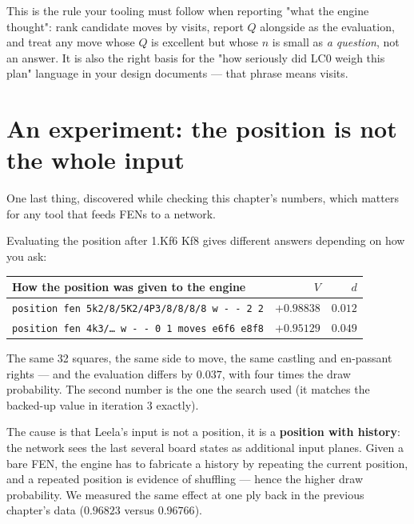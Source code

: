\begin{repobox}[title={in this repository}]
This is the rule your tooling must follow when reporting "what the engine thought": rank
candidate moves by visits, report $Q$ alongside as the evaluation, and treat any move whose
$Q$ is excellent but whose $n$ is small as \emph{a question}, not an answer. It is also the
right basis for the "how seriously did LC0 weigh this plan" language in your design
documents --- that phrase means visits.
\end{repobox}

\section{An experiment: the position is not the whole input}

One last thing, discovered while checking this chapter's numbers, which matters for any tool
that feeds FENs to a network.

Evaluating the position after 1.Kf6 Kf8 gives different answers depending on how you ask:

\begin{realdata}[title={Real experiment: same board, two histories}]
\begin{center}
\begin{tabular}{@{}lrr@{}}
\toprule
How the position was given to the engine & $V$ & $d$ \\
\midrule
\texttt{position fen 5k2/8/5K2/4P3/8/8/8/8 w - - 2 2} & $+0.98838$ & $0.012$ \\
\texttt{position fen 4k3/\ldots\ w - - 0 1 moves e6f6 e8f8} & $+0.95129$ & $0.049$ \\
\bottomrule
\end{tabular}
\end{center}
The same 32 squares, the same side to move, the same castling and en-passant rights ---
and the evaluation differs by $0.037$, with four times the draw probability. The second
number is the one the search used (it matches the backed-up value in iteration 3 exactly).
\end{realdata}

The cause is that Leela's input is not a position, it is a \textbf{position with history}:
the network sees the last several board states as additional input planes. Given a bare FEN,
the engine has to fabricate a history by repeating the current position, and a repeated
position is evidence of shuffling --- hence the higher draw probability. We measured the same
effect at one ply back in the previous chapter's data ($0.96823$ versus $0.96766$).

